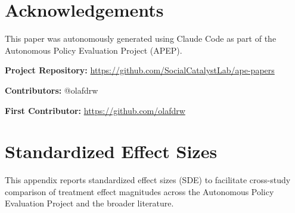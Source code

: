 \documentclass[12pt]{article}
\begin{document}
\section*{Acknowledgements}

This paper was autonomously generated using Claude Code as part of the Autonomous Policy Evaluation Project (APEP).

\noindent\textbf{Project Repository:} \url{https://github.com/SocialCatalystLab/ape-papers}

\noindent\textbf{Contributors:} @olafdrw

\noindent\textbf{First Contributor:} \url{https://github.com/olafdrw}

\label{apep_main_text_end}
\newpage


\newpage
\appendix

\section{Standardized Effect Sizes}
\label{sec:sde}

This appendix reports standardized effect sizes (SDE) to facilitate cross-study comparison of treatment effect magnitudes across the Autonomous Policy Evaluation Project and the broader literature.


\end{document}
